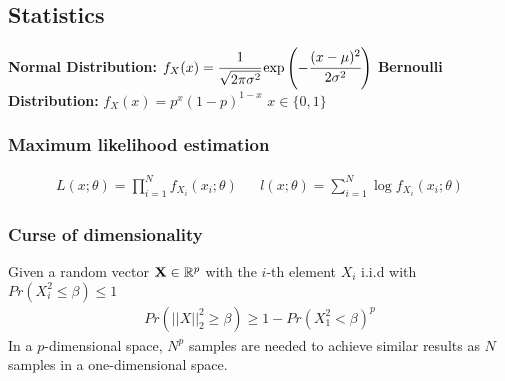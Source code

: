 \begin{mdframed}[style=eqbox]
\subsection{Statistics}
\textbf{Normal Distribution:}
\(f_X(x) = \cfrac{1}{\sqrt{2\pi \sigma^2}} \exp\left(-\cfrac{(x-\mu)^2}{2\sigma^2}\right)\)
\textbf{Bernoulli Distribution:} \(f_X(x) = p^x (1 - p)^{1-x}\) \(x \in \{0, 1\}\)
\subsubsection*{Maximum likelihood estimation}
\vspace*{-10pt}\begin{align*}
  L(x;\theta) = \prod_{i=1}^N f_{X_i}(x_i; \theta) && l(x;\theta) = \sum_{i=1}^N \log f_{X_i}(x_i; \theta)
\end{align*}
\subsubsection*{Curse of dimensionality}
Given a random vector $\mathbf{X} \in \mathbb R^p$ with the $i$-th element $X_i$ i.i.d with $Pr(X_i^2 \leq \beta) \leq 1$
\vspace*{-4pt}\begin{align*}
Pr(\vert \vert X \vert\vert_2^2 \geq \beta ) \geq 1 - Pr(X_1^2 < \beta)^p
\end{align*}
In a $p$-dimensional space, $N^p$ samples are needed to achieve similar results as $N$ samples in a one-dimensional space.
\end{mdframed}
%
